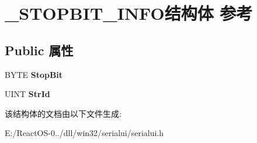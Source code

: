\hypertarget{struct___s_t_o_p_b_i_t___i_n_f_o}{}\section{\+\_\+\+S\+T\+O\+P\+B\+I\+T\+\_\+\+I\+N\+F\+O结构体 参考}
\label{struct___s_t_o_p_b_i_t___i_n_f_o}
\subsection*{Public 属性}
\begin{DoxyCompactItemize}
\item 
\mbox{\label{struct___s_t_o_p_b_i_t___i_n_f_o_a35fc0a79f5ece0f661ec884de6230a57}} 
B\+Y\+TE {\bfseries Stop\+Bit}
\item 
\mbox{\label{struct___s_t_o_p_b_i_t___i_n_f_o_a22d0ea3994432005564e72a8103a1bd7}} 
U\+I\+NT {\bfseries Str\+Id}
\end{DoxyCompactItemize}


该结构体的文档由以下文件生成\+:\begin{DoxyCompactItemize}
\item 
E\+:/\+React\+O\+S-\/0../dll/win32/serialui/serialui.\+h\end{DoxyCompactItemize}
